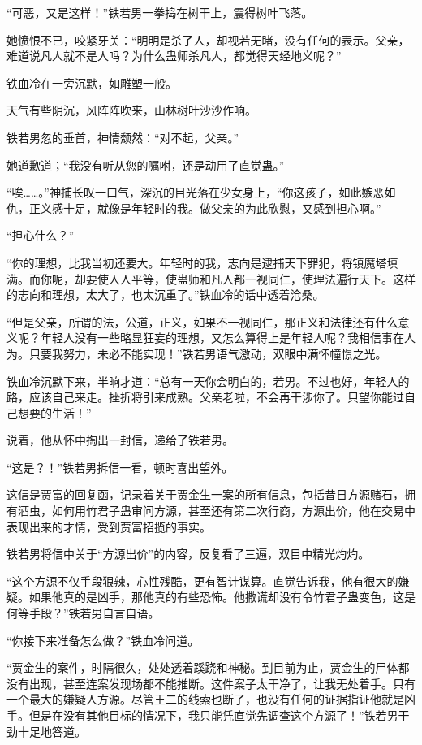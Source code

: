 \begin{this_body}
“可恶，又是这样！”铁若男一拳捣在树干上，震得树叶飞落。

她愤恨不已，咬紧牙关：“明明是杀了人，却视若无睹，没有任何的表示。父亲，难道说凡人就不是人吗？为什么蛊师杀凡人，都觉得天经地义呢？”

铁血冷在一旁沉默，如雕塑一般。

天气有些阴沉，风阵阵吹来，山林树叶沙沙作响。

铁若男忽的垂首，神情颓然：“对不起，父亲。”

她道歉道；“我没有听从您的嘱咐，还是动用了直觉蛊。”

“唉……。”神捕长叹一口气，深沉的目光落在少女身上，“你这孩子，如此嫉恶如仇，正义感十足，就像是年轻时的我。做父亲的为此欣慰，又感到担心啊。”

“担心什么？”

“你的理想，比我当初还要大。年轻时的我，志向是逮捕天下罪犯，将镇魔塔填满。而你呢，却要使人人平等，使蛊师和凡人都一视同仁，使理法遍行天下。这样的志向和理想，太大了，也太沉重了。”铁血冷的话中透着沧桑。

“但是父亲，所谓的法，公道，正义，如果不一视同仁，那正义和法律还有什么意义呢？年轻人没有一些略显狂妄的理想，又怎么算得上是年轻人呢？我相信事在人为。只要我努力，未必不能实现！”铁若男语气激动，双眼中满怀幢憬之光。

铁血冷沉默下来，半晌才道：“总有一天你会明白的，若男。不过也好，年轻人的路，应该自己来走。挫折将引来成熟。父亲老啦，不会再干涉你了。只望你能过自己想要的生活！”

说着，他从怀中掏出一封信，递给了铁若男。

“这是？！”铁若男拆信一看，顿时喜出望外。

这信是贾富的回复函，记录着关于贾金生一案的所有信息，包括昔日方源赌石，拥有酒虫，如何用竹君子蛊审问方源，甚至还有第二次行商，方源出价，他在交易中表现出来的才情，受到贾富招揽的事实。

铁若男将信中关于“方源出价”的内容，反复看了三遍，双目中精光灼灼。

“这个方源不仅手段狠辣，心性残酷，更有智计谋算。直觉告诉我，他有很大的嫌疑。如果他真的是凶手，那他真的有些恐怖。他撒谎却没有令竹君子蛊变色，这是何等手段？”铁若男自言自语。

“你接下来准备怎么做？”铁血冷问道。

“贾金生的案件，时隔很久，处处透着蹊跷和神秘。到目前为止，贾金生的尸体都没有出现，甚至连案发现场都不能推断。这件案子太干净了，让我无处着手。只有一个最大的嫌疑人方源。尽管王二的线索也断了，也没有任何的证据指证他就是凶手。但是在没有其他目标的情况下，我只能凭直觉先调查这个方源了！”铁若男干劲十足地答道。


\end{this_body}
